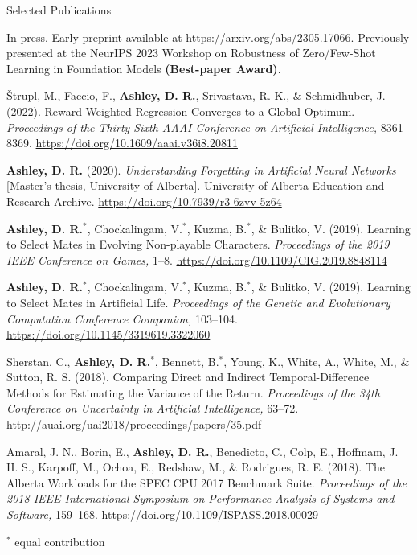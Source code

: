 \documentclass{cv}
\begin{document}
\begin{rSection}{Selected Publications}
\begin{rPublications}
        \vspace{-0.4em} In press. Early preprint available at \url{https://arxiv.org/abs/2305.17066}. Previously presented at the NeurIPS 2023 Workshop on Robustness of Zero/Few-Shot Learning in Foundation Models \textbf{(Best-paper Award)}.
    \item
        {\v{S}}trupl, M., Faccio, F., \textbf{Ashley, D. R.}, Srivastava, R. K., \& Schmidhuber, J.
        (2022).
        Reward-Weighted Regression Converges to a Global Optimum.
        \textit{Proceedings of the Thirty-Sixth AAAI Conference on Artificial Intelligence,} 8361--8369.
        \url{https://doi.org/10.1609/aaai.v36i8.20811}
    \item
        \textbf{Ashley, D. R.}
        (2020).
        \textit{Understanding Forgetting in Artificial Neural Networks} [Master's  thesis,  University  of  Alberta].
        University of Alberta Education and Research Archive.
        \url{https://doi.org/10.7939/r3-6zvv-5z64}
    \item
        \textbf{Ashley, D. R.}$^*$, Chockalingam, V.$^*$, Kuzma, B.$^*$, \& Bulitko, V.
        (2019).
        Learning to Select Mates in Evolving Non-playable Characters.
        \textit{Proceedings of the 2019 IEEE Conference on Games,} 1--8.
        \url{https://doi.org/10.1109/CIG.2019.8848114}
    \item
        \textbf{Ashley, D. R.}$^*$, Chockalingam, V.$^*$, Kuzma, B.$^*$, \& Bulitko, V.
        (2019).
        Learning to Select Mates in Artificial Life.
        \textit{Proceedings of the Genetic and Evolutionary Computation Conference Companion,} 103--104.
        \url{https://doi.org/10.1145/3319619.3322060}
    \item
        Sherstan, C., \textbf{Ashley, D. R.}$^*$, Bennett, B.$^*$, Young, K., White, A., White, M., \& Sutton, R. S.
        (2018).
        Comparing Direct and Indirect Temporal-Difference Methods for Estimating the Variance of the Return.
        \textit{Proceedings of the 34th Conference on Uncertainty in Artificial Intelligence,} 63--72.
        \url{http://auai.org/uai2018/proceedings/papers/35.pdf}
    \item
        Amaral, J. N., Borin, E., \textbf{Ashley, D. R.}, Benedicto, C., Colp, E., Hoffmam, J. H. S., Karpoff, M., Ochoa, E., Redshaw, M., \& Rodrigues, R. E.
        (2018).
        The Alberta Workloads for the SPEC CPU 2017 Benchmark Suite.
        \textit{Proceedings of the 2018 IEEE International Symposium on Performance Analysis of Systems and Software,} 159--168.
        \url{https://doi.org/10.1109/ISPASS.2018.00029}
\end{rPublications}

\vspace{-0.4em} \hfill $^*$ \footnotesize{equal contribution} \vspace{-1em}

\end{rSection}
\end{document}

